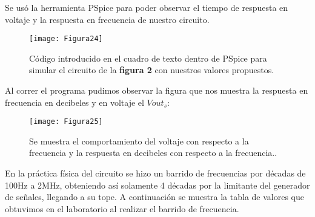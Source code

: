 \documentclass{report}
\begin{document}
	Se usó la herramienta PSpice para poder observar el tiempo de respuesta en voltaje y la respuesta en frecuencia de nuestro circuito.
	
	\begin{figure}[H]
		\centering
		\texttt{[image: Figura24]}
		\caption{ Código introducido en el cuadro de texto dentro de PSpice para simular el circuito de la \textbf{figura 2} con nuestros valores propuestos.}
		\label{fig:figura100}
	\end{figure}
	
	Al correr el programa pudimos observar la figura que nos muestra la respuesta en frecuencia en decibeles y en voltaje el $ Vout_{s} $:
	
	\begin{figure}[H]
		\centering
		\texttt{[image: Figura25]}
		\caption{  Se muestra el comportamiento del voltaje con respecto a la frecuencia y la respuesta en decibeles con respecto a la frecuencia..}
		\label{fig:figura100}
	\end{figure}
	
	En la práctica física del circuito se hizo un barrido de frecuencias por décadas de 100Hz a 2MHz, obteniendo así solamente 4 décadas por la limitante del generador de señales, llegando a su tope. A continuación se muestra la tabla de valores que obtuvimos en el laboratorio al realizar el barrido de frecuencia.
	
\end{document}
